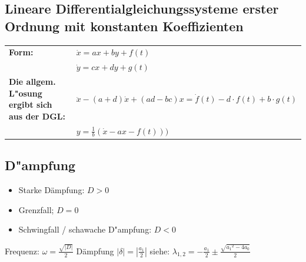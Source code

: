 \subsection{Lineare Differentialgleichungssysteme erster Ordnung mit konstanten
Koeffizienten}
\begin{tabular}{p{8cm}p{8cm}}
\textbf{Form:}&
$\dot{x}=ax+by+f(t)$\\
&
$\dot{y}=cx+dy+g(t)$\\
\textbf{Die allgem. L"osung ergibt sich aus der DGL:}&
$\ddot{x}-(a+d)\dot{x}+(ad-bc)x=\dot{f}(t)-d \cdot f(t)+b \cdot g(t)$\\
&
$y=\frac{1}{b}(\dot{x}-ax-f(t)))$\\
\end{tabular}

\subsection{D"ampfung}
\begin{itemize}
  \setlength{\itemsep}{1pt}
  \setlength{\parskip}{0pt}
  \setlength{\parsep}{0pt}
  
  \item Starke Dämpfung: $D>0$
  \item Grenzfall; $D=0$
  \item Schwingfall / schawache D"ampfung: $D<0$
\end{itemize}
Frequenz: $\omega = \frac{\sqrt{\left|D\right|}}{2}$
Dämpfung $\left|\delta\right| = \left|{\frac{a_1}{2}}\right|$
siehe: $\lambda_{1,2}= -\frac{a_1}{2}\pm \frac{\sqrt{{a_1}^2-4a_0}}{2}$
